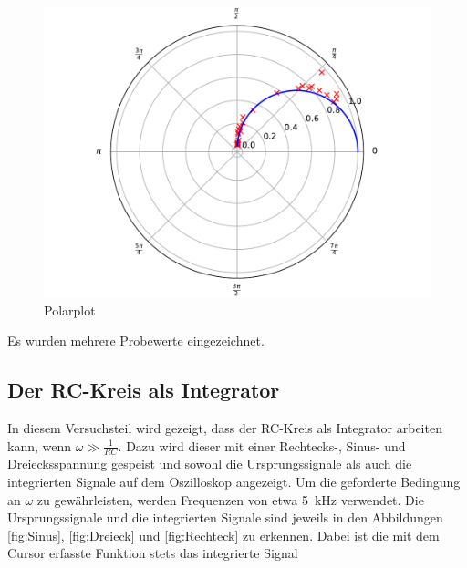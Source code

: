 \begin{figure}
  \centering
  \includegraphics[scale=0.8]{content/plot4.pdf}
  \caption{Polarplot}
  \label{fig:plot4}
\end{figure}

Es wurden mehrere Probewerte eingezeichnet.

\subsection{Der RC-Kreis als Integrator}

In diesem Versuchsteil wird gezeigt, dass der RC-Kreis als Integrator arbeiten 
kann, wenn $\omega \gg \frac{1}{RC}$. Dazu wird dieser mit einer Rechtecks-, 
Sinus- und Dreiecksspannung gespeist und sowohl die Ursprungssignale als auch 
die integrierten Signale auf dem Oszilloskop angezeigt. Um die geforderte 
Bedingung an $\omega$ zu gewährleisten, werden Frequenzen von etwa \SI{5}{\kilo\hertz}
verwendet. 
Die Ursprungssignale und die integrierten Signale sind jeweils in den Abbildungen 
\ref{fig:Sinus}, \ref{fig:Dreieck} und \ref{fig:Rechteck} zu erkennen. Dabei ist
die mit dem Cursor erfasste Funktion stets das integrierte Signal

